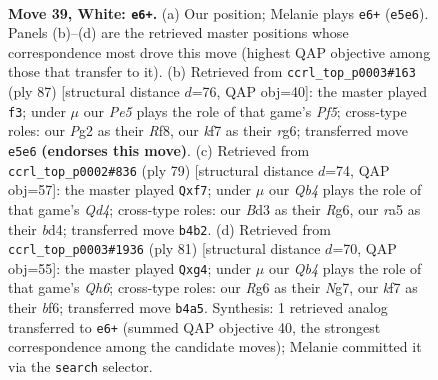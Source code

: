\documentclass[11pt]{article}
\begin{document}
\clearpage

\begin{figure}[p]\centering
\begin{subfigure}{0.46\textwidth}\centering
\resizebox{\linewidth}{!}{%
\newchessgame
\chessboard[
  setfen={7r/1b1q1k2/6R1/r3P3/1Q5p/3B3P/1p4P1/6KR w - - 2 39},
  showmover=false,
  pgfstyle=straightmove, color=movearrow, markmove={e5-e6}
]}
\caption{}
\end{subfigure}\hfill
\begin{subfigure}{0.46\textwidth}\centering
\resizebox{\linewidth}{!}{%
\newchessgame
\chessboard[
  setfen={5rk1/6r1/6R1/PpPp4/2pP1p1P/4q1P1/5R2/1Q3K2 b - - 3 44},
  showmover=false,
  pgfstyle=straightmove, color=movearrow, markmove={f4-f3}
]}
\caption{}
\end{subfigure}
\\[4pt]
\begin{subfigure}{0.46\textwidth}\centering
\resizebox{\linewidth}{!}{%
\newchessgame
\chessboard[
  setfen={8/5Rpk/p5rp/3q4/3B4/1P1QR3/P5bP/6K1 b - - 0 40},
  showmover=false,
  pgfstyle=straightmove, color=movearrow, markmove={d5-f7}
]}
\caption{}
\end{subfigure}\hfill
\begin{subfigure}{0.46\textwidth}\centering
\resizebox{\linewidth}{!}{%
\newchessgame
\chessboard[
  setfen={4r1k1/5pn1/5Bp1/p3P3/P5R1/1N5q/3Q1K2/8 b - - 0 41},
  showmover=false,
  pgfstyle=straightmove, color=movearrow, markmove={h3-g4}
]}
\caption{}
\end{subfigure}
\caption{\textbf{Move 39, White: \texttt{e6+}.} (a) Our position; Melanie plays \texttt{e6+} (\texttt{e5e6}). Panels (b)--(d) are the retrieved master positions whose correspondence most drove this move (highest QAP objective among those that transfer to it). (b) Retrieved from \texttt{ccrl\_top\_p0003\#163} (ply 87) [structural distance $d$=76, QAP obj=40]: the master played \texttt{f3}; under $\mu$ our \emph{Pe5} plays the role of that game's \emph{Pf5}; cross-type roles: our \emph{P}g2 as their \emph{R}f8, our \emph{k}f7 as their \emph{r}g6; transferred move \texttt{e5e6} \textbf{(endorses this move)}. (c) Retrieved from \texttt{ccrl\_top\_p0002\#836} (ply 79) [structural distance $d$=74, QAP obj=57]: the master played \texttt{Qxf7}; under $\mu$ our \emph{Qb4} plays the role of that game's \emph{Qd4}; cross-type roles: our \emph{B}d3 as their \emph{R}g6, our \emph{r}a5 as their \emph{b}d4; transferred move \texttt{b4b2}. (d) Retrieved from \texttt{ccrl\_top\_p0003\#1936} (ply 81) [structural distance $d$=70, QAP obj=55]: the master played \texttt{Qxg4}; under $\mu$ our \emph{Qb4} plays the role of that game's \emph{Qh6}; cross-type roles: our \emph{R}g6 as their \emph{N}g7, our \emph{k}f7 as their \emph{b}f6; transferred move \texttt{b4a5}. Synthesis: 1 retrieved analog transferred to \texttt{e6+} (summed QAP objective 40, the strongest correspondence among the candidate moves); Melanie committed it via the \texttt{search} selector.}
\label{fig:thought-m76}
\end{figure}
\end{document}
